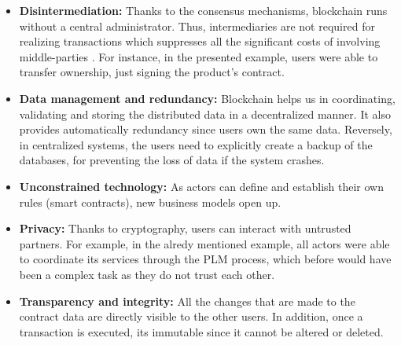 \begin{itemize}
	\item \textbf{Disintermediation:} Thanks to the consensus mechanisms, blockchain runs without a central administrator. Thus, intermediaries are not required for realizing transactions which suppresses all the significant costs of involving middle-parties \citep{mainelli2015sharing}. For instance, in the presented example, users were able to transfer ownership, just signing the product's contract.
	\item \textbf{Data management and redundancy:} Blockchain helps us in coordinating, validating and storing the distributed data in a decentralized manner. It also provides automatically redundancy since users own the same data. Reversely, in centralized systems, the users need to explicitly create a backup of the databases, for preventing the loss of data if the system crashes.
	\item \textbf{Unconstrained technology:} As actors can define and establish their own rules (smart contracts), new business models open up.
	\item \textbf{Privacy:} Thanks to cryptography, users can interact with untrusted partners. For example, in the alredy mentioned example, all actors were able to coordinate its services through the PLM process, which before would have been a complex task as they do not trust each other.
    \item \textbf{Transparency and integrity:} All the changes that are made to the contract data are directly visible to the other users. In addition, once a transaction is executed, its immutable since it cannot be altered or deleted.
	
\end{itemize}

